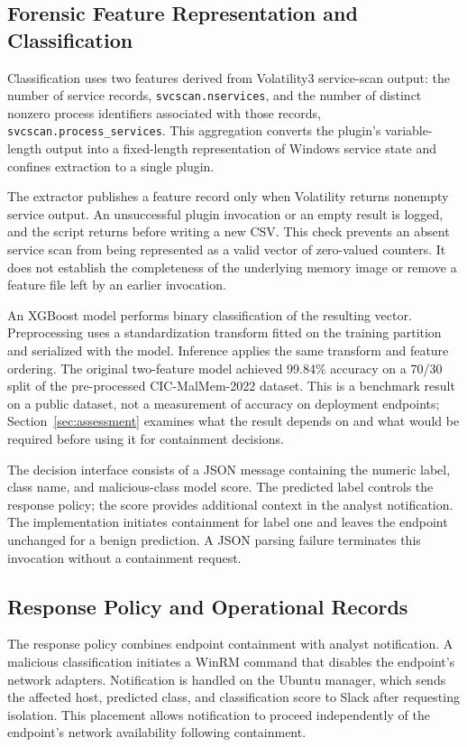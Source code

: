 \documentclass[conference]{IEEEtran}
\begin{document}
\subsection{Forensic Feature Representation and Classification}
Classification uses two features derived from Volatility3 service-scan output: the number of service records, \texttt{svcscan.nservices}, and the number of distinct nonzero process identifiers associated with those records, \texttt{svcscan.process\_services}. This aggregation converts the plugin's variable-length output into a fixed-length representation of Windows service state and confines extraction to a single plugin.

The extractor publishes a feature record only when Volatility returns
nonempty service output. An unsuccessful plugin invocation or an empty result
is logged, and the script returns before writing a new CSV. This check
prevents an absent service scan from being represented as a valid vector of
zero-valued counters. It does not establish the completeness of the underlying
memory image or remove a feature file left by an earlier invocation.

An XGBoost model performs binary classification of the resulting vector. Preprocessing uses a standardization transform fitted on the training partition and serialized with the model. Inference applies the same transform and feature ordering. The original two-feature model achieved 99.84\% accuracy on a 70/30 split of the pre-processed CIC-MalMem-2022 dataset. This is a benchmark result on a public dataset, not a measurement of accuracy on deployment endpoints; Section~\ref{sec:assessment} examines what the result depends on and what would be required before using it for containment decisions.

The decision interface consists of a JSON message containing the numeric label, class name, and malicious-class model score. The predicted label controls the response policy; the score provides additional context in the analyst notification. The implementation initiates containment for label one and leaves the endpoint unchanged for a benign prediction. A JSON parsing failure terminates this invocation without a containment request.

\subsection{Response Policy and Operational Records}
The response policy combines endpoint containment with analyst notification. A malicious classification initiates a WinRM command that disables the endpoint's network adapters. Notification is handled on the Ubuntu manager, which sends the affected host, predicted class, and classification score to Slack after requesting isolation. This placement allows notification to proceed independently of the endpoint's network availability following containment.
\end{document}
